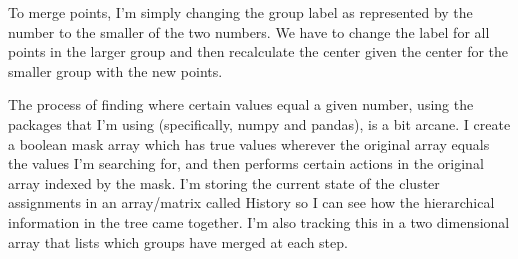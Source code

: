 \documentclass[11pt]{article}
\begin{document}
To merge points, I'm simply changing the group label as represented by
the number to the smaller of the two numbers. We have to change the
label for all points in the larger group and then recalculate the center
given the center for the smaller group with the new points.

The process of finding where certain values equal a given number, using
the packages that I'm using (specifically, numpy and pandas), is a bit
arcane. I create a boolean mask array which has true values wherever the
original array equals the values I'm searching for, and then performs
certain actions in the original array indexed by the mask. I'm storing
the current state of the cluster assignments in an array/matrix called
History so I can see how the hierarchical information in the tree came
together. I'm also tracking this in a two dimensional array that lists
which groups have merged at each step.
\end{document}
